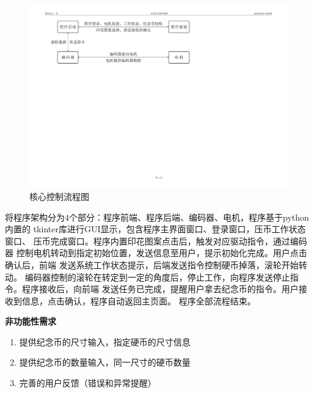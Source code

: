\documentclass[UTF8,14pt]{article}
\newcommand\sectionone[1]{\centerline{\Large{\bfseries{#1}}}}
\begin{document}
\begin{figure}[h]
	\centering
	\includegraphics[width=13.5cm]{figures/modlingfig.pdf}
	\vspace{-0.2cm}
	\caption{核心控制流程图}
\end{figure}

\vspace{-0.5cm}
将程序架构分为4个部分：程序前端、程序后端、编码器、电机，程序基于python内置的
tkinter库进行GUI显示，包含程序主界面窗口、登录窗口，压币工作状态窗口、
压币完成窗口。程序内置印花图案点击后，触发对应驱动指令，通过编码器
控制电机转动到指定初始位置，发送信息至用户，提示初始化完成。用户点击确认后，前端
发送系统工作状态提示，后端发送指令控制硬币掉落，滚轮开始转动。
编码器控制的滚轮在转定到一定的角度后，停止工作，向程序发送停止指令。程序接收后，向前端
发送任务已完成，提醒用户拿去纪念币的指令。用户接收到信息，点击确认，程序自动返回主页面。
程序全部流程结束。

\clearpage
\sectionone{非功能性需求}
\begin{enumerate}
	\item 提供纪念币的尺寸输入，指定硬币的尺寸信息
	\item 提供纪念币的数量输入，同一尺寸的硬币数量
	\item 完善的用户反馈（错误和异常提醒）
\end{enumerate}
\end{document}
